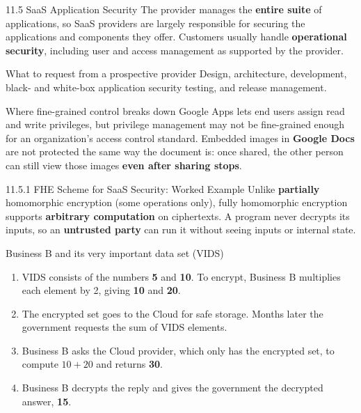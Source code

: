 \documentclass[11pt,aspectratio=169]{beamer}
\newcommand{\kw}[1]{\textbf{\color{accent}#1}}
\begin{document}
\begin{frame}{11.5 SaaS Application Security}
  \small
  The provider manages the \kw{entire suite} of applications, so SaaS providers
  are largely responsible for securing the applications and components they
  offer. Customers usually handle \kw{operational security}, including user and
  access management as supported by the provider.
  \vspace{0.7em}

  \begin{block}{What to request from a prospective provider}
    \small
    Design, architecture, development, black- and white-box application
    security testing, and release management.
  \end{block}
  \vspace{0.7em}

  \begin{exampleblock}{Where fine-grained control breaks down}
    \small
    Google Apps lets end users assign read and write privileges, but privilege
    management may not be fine-grained enough for an organization's access
    control standard. Embedded images in \kw{Google Docs} are not protected the
    same way the document is: once shared, the other person can still view
    those images \kw{even after sharing stops}.
  \end{exampleblock}
\end{frame}

\begin{frame}{11.5.1 FHE Scheme for SaaS Security: Worked Example}
  \small
  Unlike \kw{partially} homomorphic encryption (some operations only), fully
  homomorphic encryption supports \kw{arbitrary computation} on ciphertexts. A
  program never decrypts its inputs, so an \kw{untrusted party} can run it
  without seeing inputs or internal state.
  \vspace{0.7em}

  \begin{exampleblock}{Business B and its very important data set (VIDS)}
    \begin{enumerate}\small\setlength{\itemsep}{0.25em}
      \item VIDS consists of the numbers \kw{5} and \kw{10}. To encrypt,
            Business B multiplies each element by 2, giving \kw{10} and
            \kw{20}.
      \item The encrypted set goes to the Cloud for safe storage. Months later
            the government requests the sum of VIDS elements.
      \item Business B asks the Cloud provider, which only has the encrypted
            set, to compute $10 + 20$ and returns \kw{30}.
      \item Business B decrypts the reply and gives the government the
            decrypted answer, \kw{15}.
    \end{enumerate}
  \end{exampleblock}
\end{frame}
\end{document}

